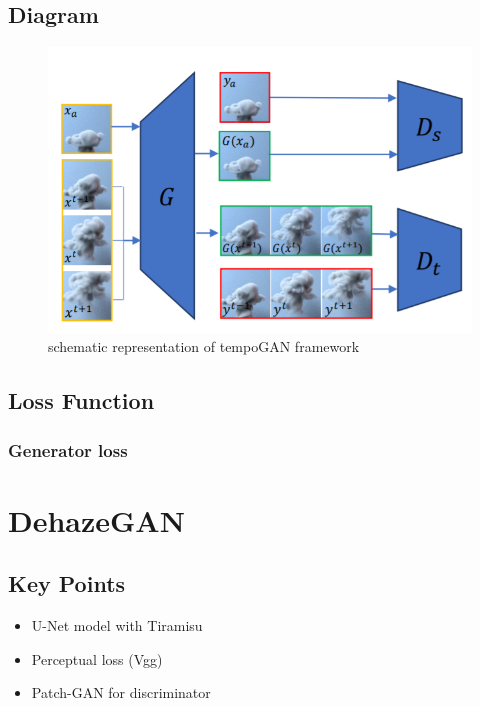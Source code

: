 \documentclass{article}
\begin{document}
\subsection{Diagram}
\begin{figure}[H]
\centering
\includegraphics{tempoGAN_diagram}
\caption{schematic representation of tempoGAN framework}
\end{figure}
\subsection{Loss Function}
\subsubsection{Generator loss}

\section{DehazeGAN}

\subsection{Key Points}
\begin{itemize}
\item U-Net model with Tiramisu
\item Perceptual loss (Vgg)
\item Patch-GAN for discriminator
\end{itemize}
\end{document}
